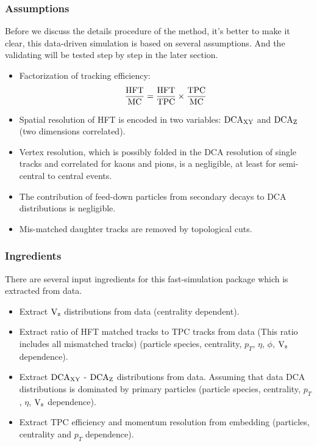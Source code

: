 \subsubsection{Assumptions}
\label{assumptions}
Before we discuss the details procedure of the method, it's better to make it clear, this data-driven simulation is based on several assumptions. And the validating will be tested step by step in the later section.
\begin{itemize}
\item Factorization of tracking efficiency:
\begin{equation}
\frac{\textup{HFT}}{\textup{MC}} = \frac{\textup{HFT}}{\textup{TPC}} \times \frac{\textup{TPC}}{\textup{MC}}
\label{efffact}
\end{equation}
\item Spatial resolution of HFT is encoded in two variables: $\textup{DCA}_{\textup{XY}}$ and $\textup{DCA}_{\textup{Z}}$ (two dimensions correlated).
\item Vertex resolution, which is possibly folded in the DCA resolution of single tracks and correlated for kaons and pions, is a negligible, at least for semi-central to central events.
\item The contribution of feed-down particles from secondary decays to DCA distributions is negligible.
\item Mis-matched daughter tracks are removed by topological cuts.
\end{itemize}

\subsubsection{Ingredients}
\label{ingredients}
There are several input ingredients for this fast-simulation package which is extracted from data.
\begin{itemize}
\item Extract $\textup{V}_\textup{z}$ distributions from data (centrality dependent).
\item Extract ratio of HFT matched tracks to TPC tracks from data (This ratio includes all mismatched tracks) (particle species, centrality, $p_T$, $\eta$, $\phi$, $\textup{V}_\textup{z}$ dependence).
\item Extract $\textup{DCA}_{\textup{XY}}$ - $\textup{DCA}_{\textup{Z}}$ distributions from data. Assuming that data DCA distributions is dominated by primary particles (particle species, centrality, $p_T$, $\eta$, $\textup{V}_\textup{z}$ dependence).
\item Extract TPC efficiency and momentum resolution from embedding (particles, centrality and $p_T$ dependence).
\end{itemize}

